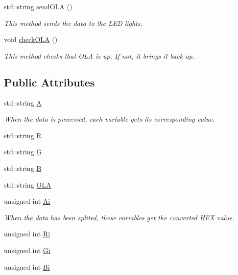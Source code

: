 \begin{DoxyCompactItemize}
std\+::string \hyperlink{classDMX512_adb00c53d6367188e848fea660d31da28}{send\+O\+LA} ()
\begin{DoxyCompactList}\small\item\em This method sends the data to the L\+ED lights. \end{DoxyCompactList}\item 
void \hyperlink{classDMX512_a12731a1553eed443a1ebbc6aa7e92864}{check\+O\+LA} ()
\begin{DoxyCompactList}\small\item\em This method checks that O\+LA is up. If not, it brings it back up. \end{DoxyCompactList}\end{DoxyCompactItemize}
\subsection*{Public Attributes}
\begin{DoxyCompactItemize}
\item 
std\+::string \hyperlink{classDMX512_a51cddf44923b3cd81ad448b461315c1d}{A}
\begin{DoxyCompactList}\small\item\em When the data is processed, each variable gets its corresponding value. \end{DoxyCompactList}\item 
std\+::string \hyperlink{classDMX512_a231a85f100b6b81a202143d858ed26d1}{R}
\item 
std\+::string \hyperlink{classDMX512_ae7d4142513f8c3978c93f39bf5c1c599}{G}
\item 
std\+::string \hyperlink{classDMX512_af3306a5965828c8eb012e2d570f7614e}{B}
\item 
std\+::string \hyperlink{classDMX512_a266eca0f1d1836e8122edd5efeae3c84}{O\+LA}
\item 
unsigned int \hyperlink{classDMX512_ae450756118a5e3d1173fd564deeb11c3}{Ai}
\begin{DoxyCompactList}\small\item\em When the data has been splited, these variables get the converted H\+EX value. \end{DoxyCompactList}\item 
unsigned int \hyperlink{classDMX512_aa5ffc37b24d0a79180d13663a5cf8379}{Ri}
\item 
unsigned int \hyperlink{classDMX512_afa6a4f81386fd8c8fc86a156fc7018e1}{Gi}
\item 
unsigned int \hyperlink{classDMX512_a8f4300cb289c94e708314c1bb3078ca8}{Bi}
\end{DoxyCompactItemize}


